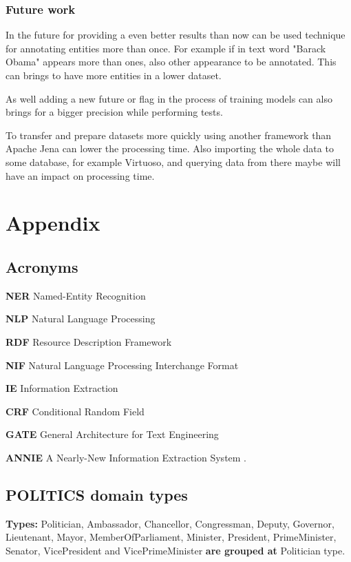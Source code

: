 \documentclass[thesis=M,english]{FITthesis}[2018/05/30]
\begin{document}
\begin{conclusion}
\subsection{Future work}
	
	 In the future for providing a even better results than now can be used technique for annotating entities more than once. For example if in text word "Barack Obama" appears more than ones, also other appearance to be annotated. This can brings to have more entities in a lower dataset.
	 
	 As well adding a new future or flag in the process of training models can also brings for a bigger precision while performing tests. 
	 
	 To transfer and prepare datasets more quickly using another framework than Apache Jena can lower the processing time. Also importing the whole data to some database, for example Virtuoso, and querying data from there maybe will have an impact on processing time.

\end{conclusion}






\appendix
\chapter{Appendix}

\section{Acronyms}
\textbf{NER} Named-Entity Recognition

\textbf{NLP} Natural Language Processing

\textbf{RDF} Resource Description Framework

\textbf{NIF} Natural Language Processing Interchange Format

\textbf{IE} Information Extraction

\textbf{CRF} Conditional Random Field

\textbf{GATE} General Architecture for Text Engineering

\textbf{ANNIE} A Nearly-New Information Extraction System
.

\section{POLITICS domain types}\label{PoliticsTypes}
\textbf{Types:} Politician, Ambassador, Chancellor, Congressman, Deputy, Governor, Lieutenant, Mayor, MemberOfParliament, Minister, President, PrimeMinister, Senator, VicePresident and VicePrimeMinister \textbf{are grouped at} Politician type.
\end{document}
